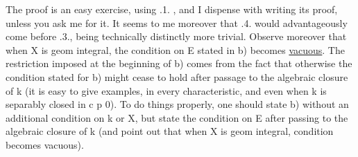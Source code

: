 The proof is an easy exercise, using .1. , and I
dispense with writing its proof, unless you ask me for it. It
 seems to me moreover that .4. would advantageously come before .3.,
being technically distinctly more trivial. Observe moreover that when
X is geom integral, the condition on E stated in b) becomes \uline{vacuous}.
The restriction imposed at the beginning of b) comes from the fact that otherwise
the condition stated for b) might cease to hold after passage
to the algebraic closure of k (it is easy to give examples,
in every characteristic, and even when k is separably closed in
c p \hand{$>$} 0). To do things properly, one should state b) without an additional condition
on k or X, but state the condition on E after passing to the
algebraic closure of k (and point out that when X is geom integral, 
condition becomes vacuous). 

